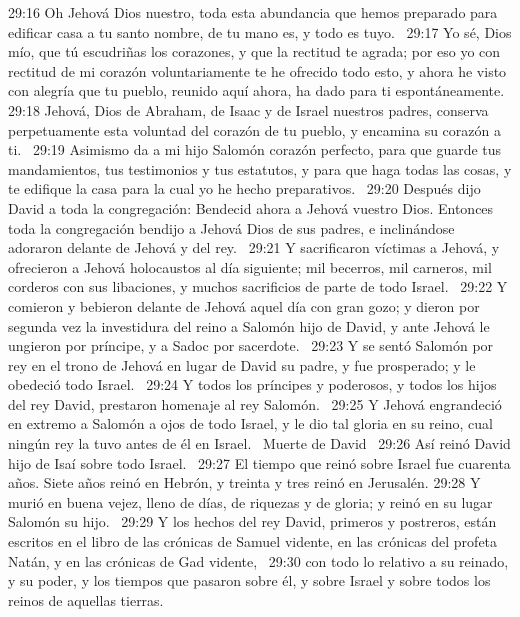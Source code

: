 29:16 Oh Jehová Dios nuestro, toda esta abundancia que hemos preparado para edificar casa a tu santo nombre, de tu mano es, y todo es tuyo.  
29:17 Yo sé, Dios mío, que tú escudriñas los corazones, y que la rectitud te agrada; por eso yo con rectitud de mi corazón voluntariamente te he ofrecido todo esto, y ahora he visto con alegría que tu pueblo, reunido aquí ahora, ha dado para ti espontáneamente.  
29:18 Jehová, Dios de Abraham, de Isaac y de Israel nuestros padres, conserva perpetuamente esta voluntad del corazón de tu pueblo, y encamina su corazón a ti.  
29:19 Asimismo da a mi hijo Salomón corazón perfecto, para que guarde tus mandamientos, tus testimonios y tus estatutos, y para que haga todas las cosas, y te edifique la casa para la cual yo he hecho preparativos.  
29:20 Después dijo David a toda la congregación: Bendecid ahora a Jehová vuestro Dios. Entonces toda la congregación bendijo a Jehová Dios de sus padres, e inclinándose adoraron delante de Jehová y del rey.  
29:21 Y sacrificaron víctimas a Jehová, y ofrecieron a Jehová holocaustos al día siguiente; mil becerros, mil carneros, mil corderos con sus libaciones, y muchos sacrificios de parte de todo Israel.  
29:22 Y comieron y bebieron delante de Jehová aquel día con gran gozo; y dieron por segunda vez la investidura del reino a Salomón hijo de David, y ante Jehová le ungieron por príncipe, y a Sadoc por sacerdote.  
29:23 Y se sentó Salomón por rey en el trono de Jehová en lugar de David su padre, y fue prosperado; y le obedeció todo Israel.  
29:24 Y todos los príncipes y poderosos, y todos los hijos del rey David, prestaron homenaje al rey Salomón.  
29:25 Y Jehová engrandeció en extremo a Salomón a ojos de todo Israel, y le dio tal gloria en su reino, cual ningún rey la tuvo antes de él en Israel.  
Muerte de David  
29:26 Así reinó David hijo de Isaí sobre todo Israel.  
29:27 El tiempo que reinó sobre Israel fue cuarenta años. Siete años reinó en Hebrón, y treinta y tres reinó en Jerusalén. 
29:28 Y murió en buena vejez, lleno de días, de riquezas y de gloria; y reinó en su lugar Salomón su hijo.  
29:29 Y los hechos del rey David, primeros y postreros, están escritos en el libro de las crónicas de Samuel vidente, en las crónicas del profeta Natán, y en las crónicas de Gad vidente,  
29:30 con todo lo relativo a su reinado, y su poder, y los tiempos que pasaron sobre él, y sobre Israel y sobre todos los reinos de aquellas tierras.

